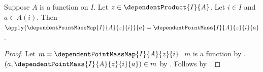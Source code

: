 \begin{proposition}\label{spike_dependent_point_mass_map_apply}
    Suppose $A$ is a function on $I$.
    Let $z\in\dependentProduct{I}{A}$.
    Let $i\in I$ and $a\in A(i)$.
    Then
        $\apply{\dependentPointMassMap{I}{A}{z}{i}}{a}
            =\dependentPointMass{I}{A}{z}{i}{a}$.
\end{proposition}
\begin{proof}
    Let $m=\dependentPointMassMap{I}{A}{z}{i}$.
    $m$ is a function by
        .
    $(a,\dependentPointMass{I}{A}{z}{i}{a})\in m$ by
        .
    Follows by .
\end{proof}
